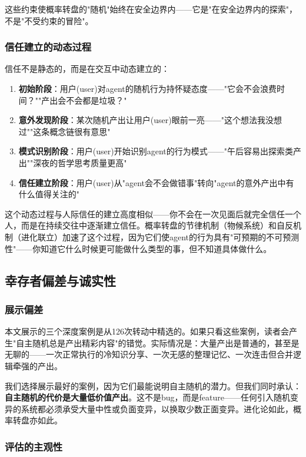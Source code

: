 \documentclass[12pt,a4paper]{ctexart}
\begin{document}
这些约束使概率转盘的"随机"始终在安全边界内——它是"在安全边界内的探索"，不是"不受约束的冒险"。

\subsubsection{信任建立的动态过程}

信任不是静态的，而是在交互中动态建立的：

\begin{enumerate}[nosep]
\item \textbf{初始阶段}：用户(user)对agent的随机行为持怀疑态度——"它会不会浪费时间？""产出会不会都是垃圾？"
\item \textbf{意外发现阶段}：某次随机产出让用户(user)眼前一亮——"这个想法我没想过""这条概念链很有意思"
\item \textbf{模式识别阶段}：用户(user)开始识别agent的行为模式——"午后容易出探索类产出""深夜的哲学思考质量更高"
\item \textbf{信任建立阶段}：用户(user)从"agent会不会做错事"转向"agent的意外产出中有什么值得关注的"
\end{enumerate}

这个动态过程与人际信任的建立高度相似——你不会在一次见面后就完全信任一个人，而是在持续交往中逐渐建立信任。概率转盘的节律机制（物候系统）和自反机制（进化联立）加速了这个过程，因为它们使agent的行为具有"可预期的不可预测性"——你知道它什么时候更可能做什么类型的事，但不知道具体做什么。

\subsection{幸存者偏差与诚实性}

\subsubsection{展示偏差}

本文展示的三个深度案例是从126次转动中精选的。如果只看这些案例，读者会产生"自主随机总是产出精彩内容"的错觉。实际情况是：大量产出是普通的，甚至是无聊的——一次正常执行的冷知识分享、一次无感的整理记忆、一次连击但合并逻辑牵强的产出。

我们选择展示最好的案例，因为它们最能说明自主随机的潜力。但我们同时承认：\textbf{自主随机的代价是大量低价值产出}。这不是bug，而是feature——任何引入随机变异的系统都必须承受大量中性或负面变异，以换取少数正面变异。进化论如此，概率转盘亦如此。

\subsubsection{评估的主观性}
\end{document}
